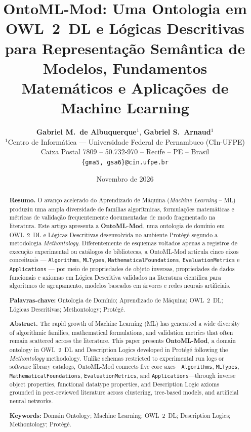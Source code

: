\documentclass[11pt,a4paper]{article}
\title{\vspace{-1.0cm}\textbf{\Large OntoML-Mod: Uma Ontologia em OWL~2~DL e Lógicas Descritivas para Representação Semântica de Modelos, Fundamentos Matemáticos e Aplicações de Machine Learning}}
\author{
  \textbf{Gabriel M.\ de Albuquerque}$^{1}$, \textbf{Gabriel S.\ Arnaud}$^{1}$\\[4pt]
  \small $^{1}$Centro de Informática --- Universidade Federal de Pernambuco (CIn-UFPE)\\
  \small Caixa Postal 7809 -- 50.732-970 -- Recife -- PE -- Brasil\\
  \small \texttt{\{gma5, gsa6\}@cin.ufpe.br}
}
\date{\small Novembro de 2026}
\newcommand{\onto}[1]{\texttt{\small #1}}
\begin{document}
\maketitle
\vspace{-0.4cm}

\begin{abstract}
\noindent\textbf{Resumo.} O avanço acelerado do Aprendizado de Máquina (\emph{Machine Learning} -- ML) produziu uma ampla diversidade de famílias algorítmicas, formulações matemáticas e métricas de validação frequentemente documentadas de modo fragmentado na literatura. Este artigo apresenta a \textbf{OntoML-Mod}, uma ontologia de domínio em OWL~2~DL e Lógicas Descritivas desenvolvida no ambiente Protégé segundo a metodologia \emph{Methontology}. Diferentemente de esquemas voltados apenas a registros de execução experimental ou catálogos de bibliotecas, a OntoML-Mod articula cinco eixos conceituais --- \onto{Algorithms}, \onto{MLTypes}, \onto{MathematicalFoundations}, \onto{EvaluationMetrics} e \onto{Applications} --- por meio de propriedades de objeto inversas, propriedades de dados funcionais e axiomas em Lógica Descritiva validados na literatura científica para algoritmos de agrupamento, modelos baseados em árvores e redes neurais artificiais.

\smallskip
\noindent\textbf{Palavras-chave:} Ontologia de Domínio; Aprendizado de Máquina; OWL~2~DL; Lógicas Descritivas; Methontology; Protégé.
\end{abstract}

\begin{otherlanguage}{english}
\begin{abstract}
\noindent\textbf{Abstract.} The rapid growth of Machine Learning (ML) has generated a wide diversity of algorithmic families, mathematical formulations, and validation metrics that often remain scattered across the literature. This paper presents \textbf{OntoML-Mod}, a domain ontology in OWL~2~DL and Description Logics developed in Protégé following the \emph{Methontology} methodology. Unlike schemas restricted to experimental run logs or software library catalogs, OntoML-Mod connects five core axes---\onto{Algorithms}, \onto{MLTypes}, \onto{MathematicalFoundations}, \onto{EvaluationMetrics}, and \onto{Applications}---through inverse object properties, functional datatype properties, and Description Logic axioms grounded in peer-reviewed literature across clustering, tree-based models, and artificial neural networks.

\smallskip
\noindent\textbf{Keywords:} Domain Ontology; Machine Learning; OWL~2~DL; Description Logics; Methontology; Protégé.
\end{abstract}
\end{otherlanguage}
\end{document}
